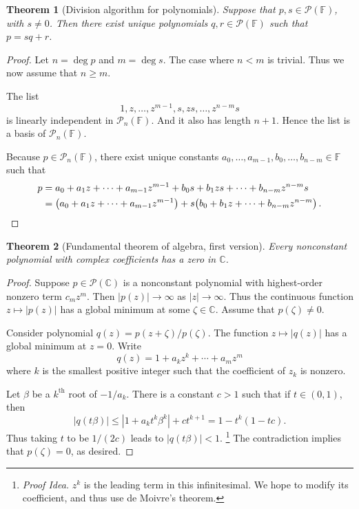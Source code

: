\documentclass[colorlinks]{tufte-handout}
\theoremstyle{plain} %
\newtheorem{thm}{Theorem}
\theoremstyle{definition}
\theoremstyle{remark}
\def\idea{\textit{\color[rgb]{0,0,.55}Proof Idea. }}
\newcommand{\bra}[1]{\mathopen{}\left(#1\right)}
\newcommand{\abs}[1]{\mathopen{}\left|#1\right|}
\newcommand{\C}{\mathbb{C}}
\newcommand{\F}{\mathbb{F}}
\renewcommand{\P}{\mathcal{P}}
\begin{document}
\begin{thm}[Division algorithm for polynomials]
	Suppose that $p,s\in\P(\F)$, with $s\neq0$. Then there exist unique polynomials $q,r\in\P(\F)$ such that $p=sq+r$.%
\end{thm}
\begin{proof}
	Let $n=\deg p$ and $m=\deg s$. The case where $n<m$ is trivial. Thus we now assume that $n\geq m$.

	The list
	\[1,z,\dots,z^{m-1},s,zs,\dots,z^{n-m}s\]
	is linearly independent in $\P_n(\F)$. And it also has length $n+1$. Hence the list is a basis of $\P_n(\F)$.

	Because $p\in\P_n(\F)$, there exist unique constants $a_0,\dots,a_{m-1},b_0,\dots,b_{n-m}\in\F$ such that
	\begin{align*}
		p&=a_0+a_1z+\cdots+a_{m-1}z^{m-1}+b_0s+b_1zs+\cdots+b_{n-m}z^{n-m}s\\
		&=\bra{a_0+a_1z+\cdots+a_{m-1}z^{m-1}}+s\bra{b_0+b_1z+\cdots+b_{n-m}z^{n-m}}.\qedhere
	\end{align*}
\end{proof}

\begin{thm}[Fundamental theorem of algebra, first version]
	Every nonconstant polynomial with complex coefficients has a zero in $\C$.
\end{thm}
\begin{proof}
	Suppose $p\in\P(\C)$ is a nonconstant polynomial with highest-order nonzero term $c_mz^m$. Then $\abs{p(z)}\to\infty$ as $\abs{z}\to\infty$. Thus the continuous function $z\mapsto\abs{p(z)}$ has a global minimum at some $\zeta\in\C$. Assume that $p(\zeta)\neq0$.

	Consider polynomial $q(z)=p(z+\zeta)/p(\zeta)$. The function $z\mapsto\abs{q(z)}$ has a global minimum at $z=0$. Write
	\[q(z)=1+a_kz^k+\cdots+a_mz^m\]
	where $k$ is the smallest positive integer such that the coefficient of $z_k$ is nonzero.
	
	Let $\beta$ be a $k^\text{th}$ root of $-1/a_k$. There is a constant $c>1$ such that if $t\in(0,1)$, then
	\[\abs{q(t\beta)}\leq\abs{1+a_kt^k\beta^k}+ct^{k+1}=1-t^k(1-tc).\]
	Thus taking $t$ to be $1/(2c)$ leads to $\abs{q(t\beta)}<1$.%
	\footnote{\idea $z^k$ is the leading term in this infinitesimal. We hope to modify its coefficient, and thus use de Moivre's theorem.}
	The contradiction implies that $p(\zeta)=0$, as desired.
\end{proof}
\end{document}
